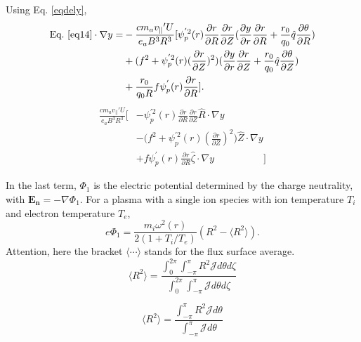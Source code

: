 \documentclass[12pt]{article}
\begin{document}
\begin{CJK*}{UTF8}{gbsn}
Using Eq. \ref{eqdely},
\begin{equation}
\begin{split}
    \textrm{Eq.}\ \ref{eq14} \cdot\nabla y =& -\frac{cm_av_{\parallel}{'}U}{e_aB^3R^3}[\psi_p^{'2}(r)\frac{\partial r}{\partial R}\frac{\partial r}{\partial Z}
    (\frac{\partial y}{\partial r}\frac{\partial r}{\partial R} + \frac{r_0}{q_0}\hat{q}\frac{\partial \theta}{\partial R})\\
    &+ (f^2 + \psi_p^{'2}(r)(\frac{\partial r}{\partial Z})^2)(\frac{\partial y}{\partial r}\frac{\partial r}{\partial Z} + 
    \frac{r_0}{q_0}\hat{q}\frac{\partial \theta}{\partial Z})\\
    &+ \frac{r_0}{q_0R}f\psi_p^{'}(r)\frac{\partial r}{\partial R}].
\end{split}
\end{equation}
{\color{blue}
\begin{equation*}
    \begin{split}
        \frac{cm_av_{\parallel}{'}U}{e_aB^3R^3}\bigg[&-\psi_p^{'2}(r)\frac{\partial r}{\partial R}\frac{\partial r}{\partial Z}
        \hat{R}\cdot\nabla y\\
        &- \bigg(f^2 + \psi_p^{'2}(r)(\frac{\partial r}{\partial Z})^2\bigg)\hat{Z}\cdot\nabla y\\
        &+ f\psi_p^{'}(r)\frac{\partial r}{\partial R}\hat{\zeta}\cdot\nabla y\qquad\qquad\quad\bigg]
    \end{split}
\end{equation*}
}


In the last term, $\Phi_1$ is the electric potential determined by the charge neutrality, with $\mathbf{E_n}=-\nabla\Phi_1$. For a plasma with a single ion species with ion 
temperature $T_i$ and electron temperature $T_e$, 
\begin{equation}
    e\Phi_1=\frac{m_i\omega^2(r)}{2(1+T_i/T_e)}(R^2 - \langle R^2\rangle).
\end{equation}
Attention, here the bracket $\langle\cdots\rangle$ stands for the flux surface average.
\begin{equation}
    \langle R^2 \rangle=\frac{\int_{0}^{2 \pi} \int_{-\pi}^{\pi} R^2 \mathcal{J} d \theta d \zeta}{\int_{0}^{2 \pi} \int_{-\pi}^{\pi} \mathcal{J} d \theta d \zeta}
\end{equation}

\begin{equation}
    \langle R^2 \rangle=\frac{\int_{-\pi}^{\pi} R^2 \mathcal{J} d \theta}{\int_{-\pi}^{\pi} \mathcal{J} d \theta}
\end{equation}


\end{CJK*}
\end{document}
